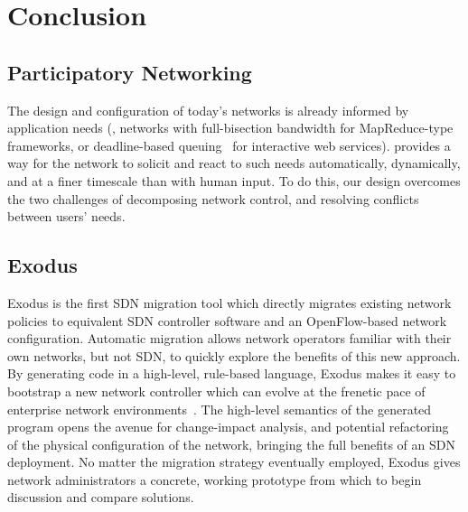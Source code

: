 \chapter{Conclusion}
\label{sec:conclusion}

\section{Participatory Networking}
\label{sec:exodus-conclusion}

The design and configuration of today's networks is already informed
by application needs (\eg,
networks with full-bisection bandwidth for MapReduce-type frameworks,
or deadline-based queuing~\cite{Ballani:2011} for interactive web services).
\sys provides a way for the network to solicit and react to such needs
automatically, dynamically, and at a finer timescale than with human input.
To do this, our design overcomes the two challenges of decomposing network
control, and resolving conflicts between users' needs.


\section{Exodus}
\label{sec:exodus-conclusion}

Exodus is the first SDN migration tool which directly migrates existing network
policies to equivalent SDN controller software and an OpenFlow-based
network configuration. Automatic migration allows network operators familiar
with their own networks, but not SDN, to quickly explore the benefits of this new
approach.
By generating code in a high-level, rule-based language, Exodus
makes it easy to bootstrap a new network controller which can evolve
at the frenetic pace of enterprise network environments~\cite{kim11evolution}.
The high-level semantics of the generated program opens the avenue
for change-impact analysis, and potential refactoring of the physical 
configuration of the network, bringing the full benefits of an SDN
deployment.
No matter the migration strategy eventually employed, Exodus gives
network administrators a concrete, working prototype from which to begin
discussion and compare solutions.

